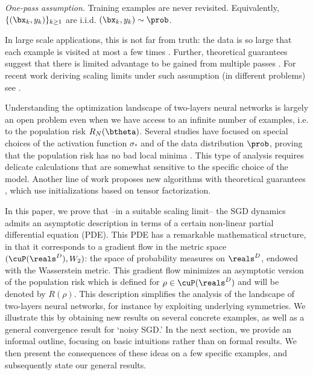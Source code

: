 \documentclass[11pt]{article}
\begin{document}
\vspace{0.1cm}

\noindent\emph{One-pass assumption.} Training examples are never revisited. Equivalently, $\{(\bx_k,y_k)\}_{k\ge 1}$ are
i.i.d. $(\bx_k,y_k)\sim\prob$.

\vspace{0.1cm}

In large scale applications, this is not far from truth: the data is so large that each example
is visited at most a few times \cite{bottou2010large}. Further, theoretical guarantees suggest
that there is limited advantage to be gained from multiple passes \cite{shalev2014understanding}. For recent work deriving scaling limits under such assumption (in different problems) see \cite{wang2017scaling}.

Understanding the optimization landscape of two-layers neural 
networks is largely an open problem even when we have access to an infinite number of examples,
i.e. to the population risk $R_{N}(\btheta)$. Several studies have focused on special choices of the activation function
$\sigma_*$ and of the data distribution $\prob$, proving that the population
risk has no bad local minima \cite{soltanolkotabi2017theoretical,ge2017learning,brutzkus2017globally}. This type
of analysis requires delicate calculations that are somewhat sensitive to the specific choice of the model.
Another line of work proposes new algorithms with theoretical guarantees
\cite{arora2014provable,sedghi2015provable, janzamin2015beating,zhang2016l1,tian2017symmetry,zhong2017recovery},
which  use initializations  based on  tensor factorization.

In this paper, we prove that --in a suitable scaling limit-- the SGD dynamics admits an asymptotic description in terms of
a certain non-linear partial differential equation (PDE). This PDE has a remarkable mathematical structure, in that it corresponds to a gradient flow
in the metric space $(\cuP(\reals^D),W_2)$: the space of probability measures on $\reals^D$, endowed with the Wasserstein metric. This gradient flow minimizes
an asymptotic version of the population risk which is defined for $\rho\in\cuP(\reals^D)$ and will be denoted by $R(\rho)$. 
This description simplifies  the analysis of the landscape of 
two-layers neural networks, for instance by exploiting underlying symmetries. We illustrate this by obtaining new results on several concrete examples,
as well as a general convergence result for `noisy SGD.'
In the next section, we provide an informal outline, focusing on basic intuitions rather than on formal results.
We then present the consequences of these ideas on a few specific examples, and subsequently
state our general results. 
\end{document}

